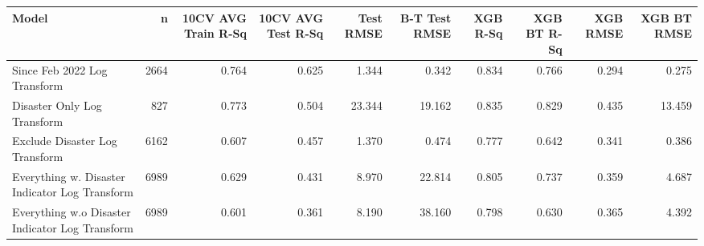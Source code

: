 
\begin{tabular}{l|r|r|r|r|r|r|r|r|r}
\hline
Model & n & 10CV AVG Train R-Sq & 10CV AVG Test R-Sq & Test RMSE & B-T Test RMSE & XGB R-Sq & XGB BT R-Sq & XGB RMSE & XGB BT RMSE\\
\hline
Since Feb 2022 Log Transform & 2664 & 0.764 & 0.625 & 1.344 & 0.342 & 0.834 & 0.766 & 0.294 & 0.275\\
\hline
Disaster Only Log Transform & 827 & 0.773 & 0.504 & 23.344 & 19.162 & 0.835 & 0.829 & 0.435 & 13.459\\
\hline
Exclude Disaster Log Transform & 6162 & 0.607 & 0.457 & 1.370 & 0.474 & 0.777 & 0.642 & 0.341 & 0.386\\
\hline
Everything w. Disaster Indicator Log Transform & 6989 & 0.629 & 0.431 & 8.970 & 22.814 & 0.805 & 0.737 & 0.359 & 4.687\\
\hline
Everything w.o Disaster Indicator Log Transform & 6989 & 0.601 & 0.361 & 8.190 & 38.160 & 0.798 & 0.630 & 0.365 & 4.392\\
\hline
\end{tabular}
